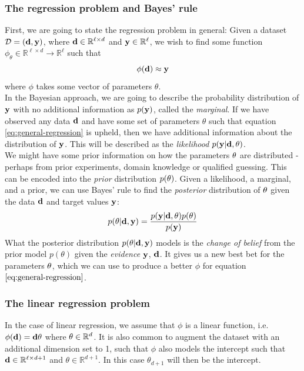 \subsubsection{The regression problem and Bayes' rule}
First, we are going to state the regression problem in general: 
Given a dataset $\mathcal{D} = (\mathbf{d}, \mathbf{y})$, where $\mathbf{d}\in \mathbb{R}^{\ell \times d}$ and $\mathbf{y} \in \mathbb{R}^{\ell}$, 
we wish to find some function $\phi_\theta \in \mathbb{R}^{\ell \times d} \rightarrow \mathbb{R}^{\ell}$ such that
\begin{equation}
  \label{eq:general-regression}
\phi(\mathbf{d}) \approx \mathbf{y}
\end{equation}
where $\phi$ takes some vector of parameters $\theta$.\\
In the Bayesian approach, we are going to describe the probability distribution of $\mathbf{y}$ with no additional information as $p(\mathbf{y})$, called the \textit{marginal}.
If we have observed any data $\mathbf{d}$ and have some set of parameters $\theta$ such that equation \ref{eq:general-regression} is upheld, then we have additional information about the distribution of $\mathbf{y}$.
This will be described as the \textit{likelihood} $p(\mathbf{y} | \mathbf{d}, \mathbf{\theta})$.\\
We might have some prior information on how the parameters $\mathbf{\theta}$ are distributed - perhaps from prior experiments, domain knowledge or qualified guessing. This can be encoded into the \textit{prior} distribution $p(\mathbf{\theta})$.
Given a likelihood, a marginal, and a prior, we can use Bayes' rule to find the \textit{posterior} distribution of $\mathbf{\theta}$ given the data $\mathbf{d}$ and target values $\mathbf{y}$:
\begin{equation}
  \label{eq:bayes-rule}
  p(\mathbf{\theta} | \mathbf{d}, \mathbf{y}) = \frac{p(\mathbf{y} | \mathbf{d}, \mathbf{\theta})p(\mathbf{\theta})}{p(\mathbf{y})}
\end{equation}
What the posterior distribution $p(\mathbf{\theta} | \mathbf{d}, \mathbf{y})$ models is the \textit{change of belief} from the prior model $p(\theta)$ given the \textit{evidence} $\mathbf{y}$, $\mathbf{d}$\cite{krause22}.
It gives us a new best bet for the parameters $\mathbf{\theta}$, which we can use to produce a better $\phi$ for equation $\ref{eq:general-regression}$.
\subsubsection{The linear regression problem}
In the case of linear regression, we assume that $\phi$ is a linear function, i.e. $\phi(\mathbf{d}) = \mathbf{d}\mathbf{\theta}$ where $\mathbf{\theta}\in \mathbb{R}^{d}$. 
It is also common to augment the dataset with an additional dimension set to 1, such that $\phi$ also models the intercept such that $\mathbf{d} \in \mathbb{R}^{\ell \times d + 1}$ and $\theta \in \mathbb{R}^{d + 1}$. In this case $\theta_{d+1}$ will then be the intercept.\\


